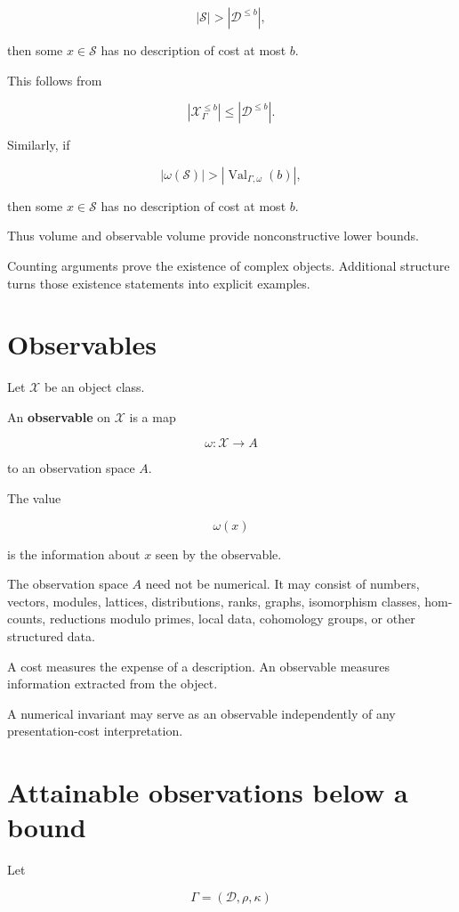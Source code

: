 \documentclass[11pt]{article}
\begin{document}
\[
|\mathcal S|>|\mathcal D^{\leq b}|,
\]

then some \(x\in\mathcal S\) has no description of cost at most \(b\).

This follows from

\[
|\mathcal X_\Gamma^{\leq b}|
\leq
|\mathcal D^{\leq b}|.
\]

Similarly, if

\[
|\omega(\mathcal S)|>|\operatorname{Val}_{\Gamma,\omega}(b)|,
\]

then some \(x\in\mathcal S\) has no description of cost at most \(b\).

Thus volume and observable volume provide nonconstructive lower bounds.

Counting arguments prove the existence of complex objects. Additional structure turns those existence statements into explicit examples.


\section{Observables}

Let \(\mathcal X\) be an object class.

An \textbf{observable} on \(\mathcal X\) is a map

\[
\omega:\mathcal X\to A
\]

to an observation space \(A\).

The value

\[
\omega(x)
\]

is the information about \(x\) seen by the observable.

The observation space \(A\) need not be numerical. It may consist of numbers, vectors, modules, lattices, distributions, ranks, graphs, isomorphism classes, hom-counts, reductions modulo primes, local data, cohomology groups, or other structured data.

A cost measures the expense of a description. An observable measures information extracted from the object.

A numerical invariant may serve as an observable independently of any presentation-cost interpretation.


\section{Attainable observations below a bound}

Let

\[
\Gamma=(\mathcal D,\rho,\kappa)
\]
\end{document}
